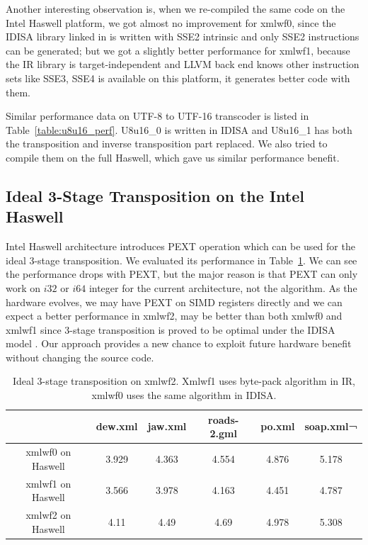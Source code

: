 Another interesting observation is, when we re-compiled the same code on the Intel Haswell platform, we got almost no improvement for xmlwf0, since the IDISA library linked in is written with SSE2 intrinsic and only SSE2 instructions can be generated; but we got a slightly better performance for xmlwf1, because the IR library is target-independent and LLVM back end knows other instruction sets like SSE3, SSE4 is available on this platform, it generates better code with them.

Similar performance data on UTF-8 to UTF-16 transcoder is listed in Table~\ref{table:u8u16_perf}. U8u16\_0 is written in IDISA and U8u16\_1 has both the transposition and inverse transposition part replaced. We also tried to compile them on the full Haswell, which gave us similar performance benefit.

\subsection{Ideal 3-Stage Transposition on the Intel Haswell}
Intel Haswell architecture introduces PEXT operation which can be used for the ideal 3-stage transposition. We evaluated its performance in Table~\ref{table:PEXT_transposition}. We can see the performance drops with PEXT, but the major reason is that PEXT can only work on $i32$ or $i64$ integer for the current architecture, not the algorithm. As the hardware evolves, we may have PEXT on SIMD registers directly and we can expect a better performance in xmlwf2, may be better than both xmlwf0 and xmlwf1 since 3-stage transposition is proved to be optimal under the IDISA model \cite{inductive_doubling_principle}. Our approach provides a new chance to exploit future hardware benefit without changing the source code.

\begin{table}[h]
\centering
\begin{tabular}{|c|c|c|c|c|c|}
\hline
        & dew.xml  &  jaw.xml  &  roads-2.gml  &  po.xml  & soap.xml¬ \\\hline
xmlwf0 on Haswell   &  3.929   &   4.363   &   4.554   &   4.876   &   5.178 \\ \hline
xmlwf1 on Haswell &   3.566   &   3.978   &   4.163   &   4.451   &   4.787 \\ \hline
xmlwf2 on Haswell & 4.11   &    4.49   &    4.69   &    4.978   &   5.308 \\ \hline
\end{tabular}
\caption[Ideal 3-Stage Transposition with PEXT]{Ideal 3-stage transposition on xmlwf2. Xmlwf1 uses byte-pack algorithm in IR, xmlwf0 uses the same algorithm in IDISA.}
\label{table:PEXT_transposition}
\end{table}

